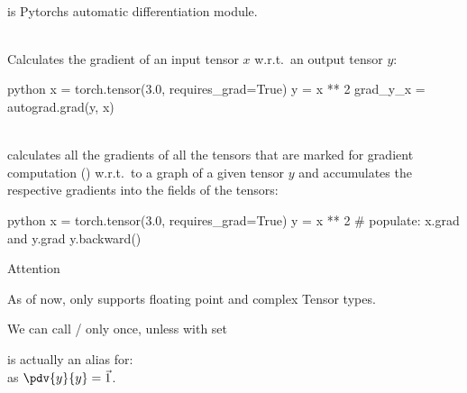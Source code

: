 \begin{defnbox}\nospacing
    \begin{defn}[Autograd]\label{defn:autograd}\leavevmode\\
         is Pytorchs automatic differentiation module.
    \end{defn}
\end{defnbox}
\begin{defnbox}\nospacing
    \begin{defn}\leavevmode\\
       Calculates the gradient of an input tensor $x$ w.r.t.\ an output tensor $y$:
        \begin{mintlinebox}{python}
            x = torch.tensor(3.0, requires_grad=True)
            y = x ** 2
            grad_y_x = autograd.grad(y, x)
        \end{mintlinebox}
    \end{defn}
\end{defnbox}
\begin{defnbox}\nospacing
    \begin{defn}\leavevmode\\
        calculates all the gradients of all the tensors that are marked for gradient computation ()
        w.r.t.\ to a graph of a given tensor $y$ and accumulates the respective gradients into the  fields of the tensors:
        \begin{mintlinebox}{python}
            x = torch.tensor(3.0, requires_grad=True)
            y = x ** 2
            # populate: x.grad and y.grad
            y.backward()
        \end{mintlinebox}
    \end{defn}
\end{defnbox}
\begin{attentionbox}{Attention}\nospacing \leavevmode
    \begin{itemizenosep}
        \item As of now,  only supports floating point and complex Tensor types.
        \item We can call / only once, unless with set 
        \item {} is actually an alias for:\\  as $\pdv{y}{y}=\vec{1}$.
    \end{itemizenosep}
\end{attentionbox}
